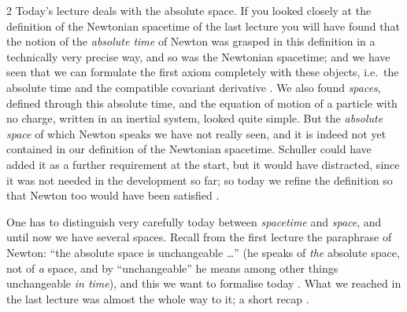 \begin{paracol}{2}
Today's lecture deals with the absolute space. If you looked closely at the definition of the Newtonian spacetime of the last lecture you will have found that the notion of the \emph{absolute time} of Newton
was grasped in this definition in a technically very precise way, and so was the Newtonian spacetime; and we have seen that we can formulate the first axiom completely with these objects, i.e.\ the absolute time and the
compatible covariant derivative . We also found \emph{spaces}, defined through this absolute time, and the equation of motion of a particle with no charge, written in an inertial system,
looked quite simple. But the \emph{absolute space} of which Newton speaks we have not really seen, and it is indeed not yet contained in our definition of the
Newtonian spacetime. Schuller could have added it as a further requirement at the start, but it would have distracted, since it was not needed in the development so far; so today we refine the definition so that
Newton too would have been satisfied .

One has to distinguish very carefully today between \emph{spacetime} and \emph{space}, and until now we have several spaces. Recall from the first lecture the paraphrase of Newton: ``the absolute space is unchangeable \dots'' (he speaks of \emph{the} absolute space, not
of \emph{a} space, and by ``unchangeable'' he means among other things unchangeable \emph{in time}), and this we want to formalise today . What we reached in the last lecture was almost the whole way to it; a short recap
.


\end{paracol}
